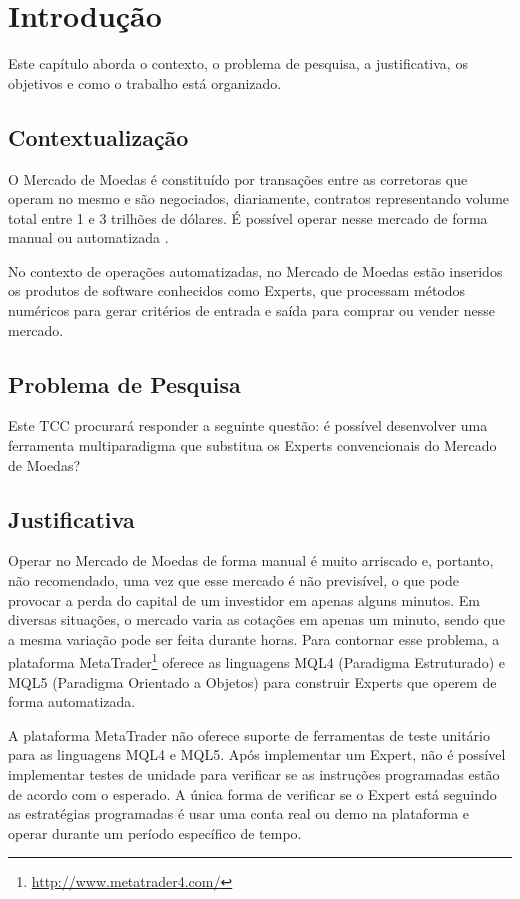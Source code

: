 \chapter{Introdução}
Este capítulo aborda o contexto, o problema de pesquisa, a justificativa, os objetivos e como o trabalho está organizado.

\section{Contextualização}
O Mercado de Moedas é constituído por transações entre as corretoras que operam no mesmo e são negociados, diariamente, contratos representando volume total entre 1 e 3 trilhões de dólares. É possível operar nesse mercado de forma manual ou automatizada \cite{cvm2009}.

No contexto de operações automatizadas, no Mercado de Moedas estão inseridos os produtos de software conhecidos como Experts, que processam métodos numéricos para gerar critérios de entrada e saída para comprar ou vender nesse mercado.

\section{Problema de Pesquisa}
Este TCC procurará responder a seguinte questão: é possível desenvolver uma ferramenta multiparadigma que substitua os Experts convencionais do Mercado de Moedas? 

\section{Justificativa}

Operar no Mercado de Moedas de forma manual é muito arriscado e, portanto, não recomendado, uma vez que esse mercado é não previsível, o que pode provocar a perda do capital de um investidor em apenas alguns minutos. Em diversas situações, o mercado varia as cotações em apenas um minuto, sendo que a mesma variação pode ser feita durante horas. Para contornar esse problema, a plataforma MetaTrader\footnote{\url{http://www.metatrader4.com/}} oferece as linguagens MQL4 (Paradigma Estruturado) e MQL5 (Paradigma Orientado a Objetos) para construir Experts que operem de forma automatizada. 

A plataforma MetaTrader não oferece suporte de ferramentas de teste unitário para as linguagens MQL4 e MQL5. Após implementar um Expert, não é possível implementar testes de unidade para verificar se as instruções programadas estão de acordo com o esperado. A única forma de verificar se o Expert está seguindo as estratégias programadas é usar uma conta real ou demo na plataforma e operar durante um período específico de tempo.

